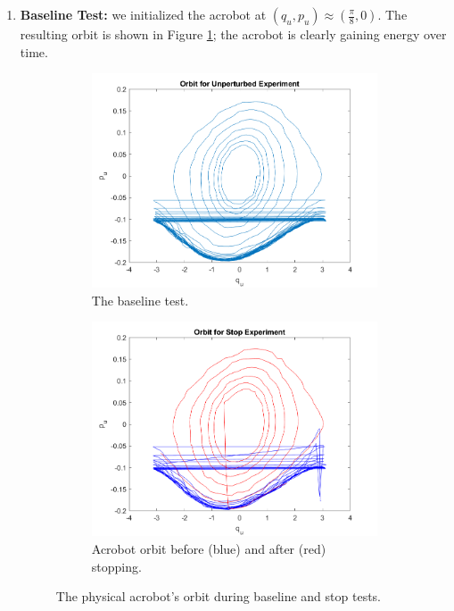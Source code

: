 \documentclass[journal,twoside,web]{ieeecolor}
\begin{document}
\begin{enumerate}
    \item \textbf{Baseline Test:} 
    we initialized the acrobot at 
    \((q_u,p_u) \approx \left(\frac{\pi}{8},0\right)\). 
    The resulting orbit is shown in Figure \ref{fig:acrobot-unperturbed-orbit};
    the acrobot is clearly gaining energy over time.

\begin{figure}
    \centering
    \begin{subfigure}[t]{0.49\linewidth}
        \includegraphics[width=\linewidth]{acrobot_unperturbed_orbit.png}
        \caption{The baseline test.}
        \label{fig:acrobot-unperturbed-orbit}
    \end{subfigure}
    \begin{subfigure}[t]{0.49\linewidth}
        \includegraphics[width=\linewidth]{acrobot_stopped_orbit.png}
        \caption{Acrobot orbit before (blue) and after (red) stopping.}
        \label{fig:acrobot-stopped-orbit}
    \end{subfigure}
    \caption{The physical acrobot's orbit during baseline and stop tests.}
\end{figure}


\end{enumerate}
\end{document}
